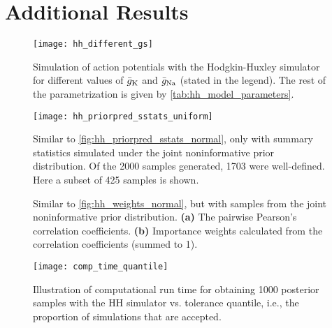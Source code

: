 \chapter{Additional Results}\label{sec:Appendix A}


\begin{figure}[H]
    \centering
    \texttt{[image: hh\_different\_gs]}
    \caption{Simulation of action potentials with the Hodgkin-Huxley simulator for different values of $\bar{g}_{\mathrm{K}}$ and $\bar{g}_{\mathrm{Na}}$ (stated in the legend). The rest of the parametrization is given by \autoref{tab:hh_model_parameters}.
    }
\end{figure}


\begin{figure}[H]
    \centering
    \texttt{[image: hh\_priorpred\_sstats\_uniform]}
    \caption{Similar to \autoref{fig:hh_priorpred_sstats_normal}, only with summary statistics simulated under the joint noninformative prior distribution. Of the 2000 samples generated, 1703 were well-defined. Here a subset of 425 samples is shown.}
\end{figure} 

\begin{figure}[H]
\centering
{}
\qquad
{}
\caption{Similar to \autoref{fig:hh_weights_normal}, but with samples from the joint noninformative prior distribution. \textbf{(a)} The pairwise Pearson's correlation coefficients. \textbf{(b)} Importance weights calculated from the correlation coefficients (summed to 1).
}
\end{figure}


 


\begin{figure}[H]
    \centering
    \texttt{[image: comp\_time\_quantile]}
    \caption{Illustration of computational run time for obtaining 1000 posterior samples with the HH simulator vs. tolerance quantile, i.e., the proportion of simulations that are accepted.}
\end{figure}

